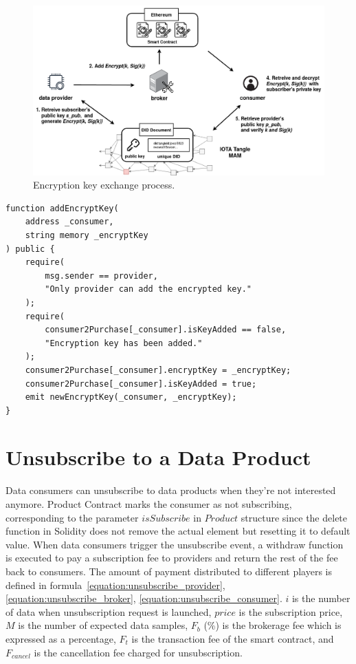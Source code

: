 \begin{spacing}{2.0}
\begin{figure}[H]
    \centering
    \includegraphics[width=5.5in]{img/key_exchange}
    \caption{Encryption key exchange process.}
    \label{fig:key_exchange}
\end{figure}
\clearpage

\lstset{style=solidity}
\begin{lstlisting}[caption={Add encryption key to data consumers}, label={lst:key_exchange}, frame=single]
function addEncryptKey(
    address _consumer,
    string memory _encryptKey
) public {
    require(
        msg.sender == provider,
        "Only provider can add the encrypted key."
    );
    require(
        consumer2Purchase[_consumer].isKeyAdded == false,
        "Encryption key has been added."
    );
    consumer2Purchase[_consumer].encryptKey = _encryptKey;
    consumer2Purchase[_consumer].isKeyAdded = true;
    emit newEncryptKey(_consumer, _encryptKey);
}
\end{lstlisting}

\section{Unsubscribe to a Data Product}
Data consumers can unsubscribe to data products when they're not interested anymore. Product Contract marks the consumer as not subscribing, corresponding to the parameter $isSubscribe$ in $Product$ structure since the delete function in Solidity does not remove the actual element but resetting it to default value. When data consumers trigger the unsubscribe event, a withdraw function is executed to pay a subscription fee to providers and return the rest of the fee back to consumers. The amount of payment distributed to different players is defined in formula~\ref{equation:unsubscribe_provider}, \ref{equation:unsubscribe_broker}, \ref{equation:unsubscribe_consumer}. $i$ is the number of data when unsubscription request is launched, $price$  is the subscription price, $M$ is the number of expected data samples, $F_{b}$ (\%) is the brokerage fee which is expressed as a percentage, $F_{t}$ is the transaction fee of the smart contract, and $F_{cancel}$ is the cancellation fee charged for unsubscription.


\end{spacing}
